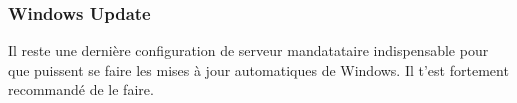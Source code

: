 \subsubsection{Windows Update}

\label{horsdomaine} %



Il reste une derni\`ere configuration de
serveur mandatataire indispensable pour que puissent se faire les mises \`a  jour automatiques
de Windows. Il t'est fortement recommand\'e de le faire.

